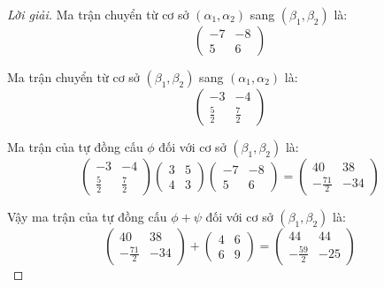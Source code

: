 \documentclass[class=linearalgebra,crop=false]{standalone}
\begin{document}
\begin{proof}[Lời giải]
    \par Ma trận chuyển từ cơ sở $(\alpha_{1}, \alpha_{2})$ sang $(\beta_{1}, \beta_{2})$ là:
    \[
        \begin{pmatrix}
            -7 & -8 \\
            5  & 6
        \end{pmatrix}
    \]
    \par Ma trận chuyển từ cơ sở $(\beta_{1}, \beta_{2})$ sang $(\alpha_{1}, \alpha_{2})$ là:
    \[
        \begin{pmatrix}
            -3 & -4 \\
            \frac{5}{2} & \frac{7}{2}
        \end{pmatrix}
    \]
    \par Ma trận của tự đồng cấu $\phi$ đối với cơ sở $(\beta_{1}, \beta_{2})$ là:
    \[
        \begin{pmatrix}
            -3 & -4 \\
            \frac{5}{2} & \frac{7}{2}
        \end{pmatrix}
        \begin{pmatrix}
            3 & 5 \\
            4 & 3
        \end{pmatrix}
        \begin{pmatrix}
            -7 & -8 \\
            5 & 6
        \end{pmatrix}
        =
        \begin{pmatrix}
            40 & 38 \\
            -\frac{71}{2} & -34
        \end{pmatrix}
    \]
    \par Vậy ma trận của tự đồng cấu $\phi + \psi$ đối với cơ sở $(\beta_{1}, \beta_{2})$ là:
    \[
        \begin{pmatrix}
            40 & 38 \\
            -\frac{71}{2} & -34
        \end{pmatrix}
        +
        \begin{pmatrix}
            4 & 6 \\
            6 & 9
        \end{pmatrix}
        =
        \begin{pmatrix}
            44 & 44 \\
            -\frac{59}{2} & -25
        \end{pmatrix}
    \]
\end{proof}
\end{document}
